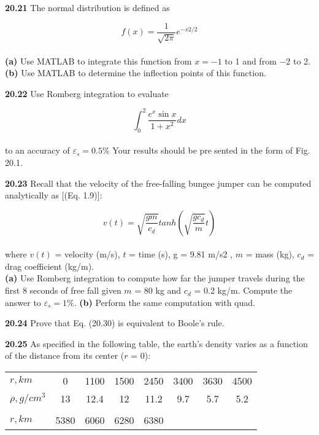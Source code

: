 \begin{multicols}{2}
{\textbf{20.21} The normal distribution is defined as

	$$f(x) = \dfrac{1}{\sqrt{2 \pi}} e^{-x2/2}$$\\
\textbf{(a)} Use MATLAB to integrate this function from $x = −1$ to
1 and from −2 to 2.\\
\textbf{(b)} Use MATLAB to determine the inflection points of this
function.

\textbf{20.22} Use Romberg integration to evaluate

	$$\int^{2}_{0} \dfrac{e^{x} \sin x}{1+x^{2}} dx$$\\
to an accuracy of $\varepsilon_{s} = 0.5\%$ Your results should be presented in the form of Fig. 20.1.

\textbf{20.23} Recall that the velocity of the free-falling bungee
jumper can be computed analytically as [(Eq. 1.9)]:

	$$v(t) = \sqrt{\dfrac{gm}{c_{d}}} tanh \left( \sqrt{\dfrac{gc_{d}}{m}} t \right)$$\\
where $v(t)$ = velocity (m/s), $t$ = time (s), g = 9.81 m/s2
, 
$m$ = mass (kg), $c_{d}$ = drag coefficient (kg/m). \\
\textbf{(a)} Use Romberg integration to compute how far the jumper
travels during the first 8 seconds of free fall given $m$ =
80 kg and $c_{d}$ = 0.2 kg/m. Compute the answer to $\varepsilon_{s} = 1\%$.
\textbf{(b)} Perform the same computation with quad.

\textbf{20.24} Prove that Eq. (20.30) is equivalent to Boole’s rule.

\textbf{20.25} As specified in the following table, the earth’s density
varies as a function of the distance from its center ($r$ = 0):\\
\begin{tabular}{lccccccc}
\hline

\scriptsize{\textbf{$r, km$}} & \scriptsize{0} & \scriptsize{1100} & \scriptsize{1500} & \scriptsize{2450} & \scriptsize{3400} & \scriptsize{3630} & \scriptsize{4500}\\

\scriptsize{\textbf{$\rho, g/cm^{3}$}} & \scriptsize{13} & \scriptsize{12.4} & \scriptsize{12} & \scriptsize{11.2} & \scriptsize{9.7} & \scriptsize{5.7} & \scriptsize{5.2}\\

\vspace{}\\

\scriptsize{\textbf{$r,km$}} & \scriptsize{5380} & \scriptsize{6060} & \scriptsize{6280} & \scriptsize{6380} & \vspace{} & \vspace{} & \vspace{}\\


\end{tabular}}
\end{multicols}
